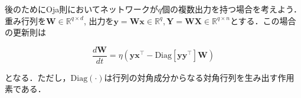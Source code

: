 後のためにOja則においてネットワークが$q$個の複数出力を持つ場合を考えよう．重み行列を$\mathbf{W} \in \mathbb{R}^{q\times d}$, 出力を$\mathbf{y}=\mathbf{W}\mathbf{x} \in \mathbb{R}^{q}, \mathbf{Y}=\mathbf{W}\mathbf{X} \in \mathbb{R}^{q\times n}$とする．この場合の更新則は


\begin{equation}
\frac{d\mathbf{W}}{dt} = \eta \left(\mathbf{y}\mathbf{x}^\top - \mathrm{Diag}\left[\mathbf{y}\mathbf{y}^\top\right] \mathbf{W}\right)
\end{equation}


となる．ただし，$\mathrm{Diag}(\cdot)$は行列の対角成分からなる対角行列を生み出す作用素である．
